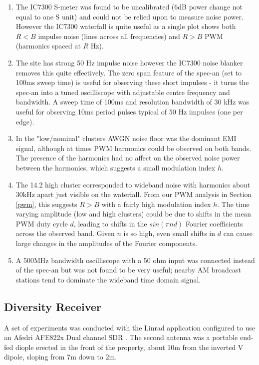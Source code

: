 \documentclass{article}
\begin{document}
\begin{enumerate}
\item The IC7300 S-meter was found to be uncalibrated (6dB power change not equal to one S unit) and could not be relied upon to measure noise power.  However the IC7300 waterfall is quite useful as a single plot shows both $R<B$ impulse noise (lines across all frequencies) and $R>B$ PWM (harmonics spaced at $R$ Hz).
\item The site has strong 50 Hz impulse noise however the IC7300 noise blanker removes this quite effectively.  The zero span feature of the spec-an (set to 100ms sweep time) is useful for observing these short impulses - it turns the spec-an into a tuned oscilliscope with adjustable centre frequency and bandwidth.  A sweep time of 100ms and resolution bandwidth of 30 kHz was useful for observing 10ms period pulses typical of 50 Hz impulses (one per edge).
\item In the "low/nominal" clusters AWGN noise floor was the dominant EMI signal, although at times PWM harmonics could be observed on both bands. The presence of the harmonics had no affect on the observed noise power between the harmonics, which suggests a small modulation index $h$.
\item The 14.2 high cluster corresponded to wideband noise with harmonics about 30kHz apart just visible on the waterfall.  From our PWM analysis in Section \ref{pwm}, this suggests $R>B$ with a fairly high modulation index $h$.  The time varying amplitude (low and high clusters) could be due to shifts in the mean PWM duty cycle $d$, leading to shifts in the $sin(\pi n d)$ Fourier coefficients across the observed band.  Given $n$ is so high, even small shifts in $d$ can cause large changes in the amplitudes of the Fourier components.
\item A 500MHz bandwidth oscilliscope with a 50 ohm input was connected instead of the spec-an but was not found to be very useful; nearby AM broadcast stations tend to dominate the wideband time domain signal.
\end{enumerate}

\subsection{Diversity Receiver}

A set of experiments was conducted with the Linrad application \cite{linrad_home} configured to use an Afedri AFE822x Dual channel SDR \cite{afedri_dual}.  The second antenna was a portable end-fed diople erected in the front of the property, about 10m from the inverted V dipole, sloping from 7m down to 2m.
\end{document}
